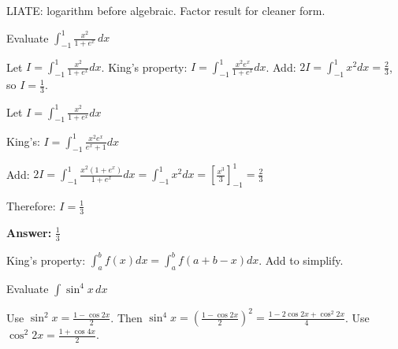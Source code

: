 \begin{takeaways}
LIATE: logarithm before algebraic. Factor result for cleaner form.
\end{takeaways}

\vspace{1cm}

\begin{problem}
Evaluate $\displaystyle \int_{-1}^{1} \frac{x^2}{1 + e^x} \, dx$
\end{problem}

\begin{hint}
Let $I = \int_{-1}^{1} \frac{x^2}{1+e^x}dx$. King's property: $I = \int_{-1}^{1} \frac{x^2 e^x}{1+e^x}dx$. Add: $2I = \int_{-1}^{1} x^2 dx = \frac{2}{3}$, so $I = \frac{1}{3}$.
\end{hint}

\begin{solution}
Let $I = \int_{-1}^1 \frac{x^2}{1+e^x}dx$

King's: $I = \int_{-1}^1 \frac{x^2e^x}{e^x+1}dx$

Add: $2I = \int_{-1}^1 \frac{x^2(1+e^x)}{1+e^x}dx = \int_{-1}^1 x^2dx = \left[\frac{x^3}{3}\right]_{-1}^1 = \frac{2}{3}$

Therefore: $I = \frac{1}{3}$

\textbf{Answer:} $\boxed{\frac{1}{3}}$
\end{solution}

\begin{takeaways}
King's property: $\int_a^b f(x)dx = \int_a^b f(a+b-x)dx$. Add to simplify.
\end{takeaways}

\vspace{1cm}

\begin{problem}
Evaluate $\displaystyle \int \sin^4 x \, dx$
\end{problem}

\begin{hint}
Use $\sin^2 x = \frac{1-\cos 2x}{2}$. Then $\sin^4 x = \left(\frac{1-\cos 2x}{2}\right)^2 = \frac{1 - 2\cos 2x + \cos^2 2x}{4}$. Use $\cos^2 2x = \frac{1+\cos 4x}{2}$.
\end{hint}


